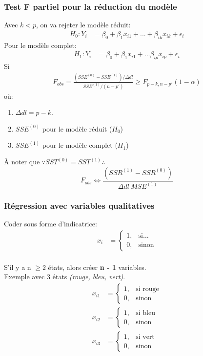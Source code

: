 \documentclass[10pt, french]{article}
\begin{document}
\begin{multicols*}{3}
\subsubsection*{Test F partiel pour la réduction du modèle}
Avec $k < p$, on va rejeter le modèle réduit:
\begin{align*}
H_0 : Y_i &= \beta_0 + \beta_1 x_{i1} + ... + \beta_{ik} x_{ik} + \epsilon_i 
\end{align*}
Pour le modèle complet:
\begin{align*}
H_1 : Y_i &= \beta_0 + \beta_1 x_{i1} + ... \beta_{ip} x_{ip} + \epsilon_i 
\end{align*}
Si
\begin{align*}
F_{obs} = \frac{(SSE^{(0)} - SSE^{(1)}) / \Delta dl}{SSE^{(1)} / (n-p')} \geq F_{p-k, n-p'}(1- \alpha)
\end{align*}
où:
\begin{enumerate}
	\item[] $\Delta dl = p - k$.
	\item[] $SSE^{(0)}$ pour le modèle réduit ($H_0$)
	\item[] $SSE^{(1)}$ pour le modèle complet ($H_1$)
\end{enumerate}

À noter que $\because SST^{(0)} = SST^{(1)} \therefore$
\[
	F_{obs} \Leftrightarrow \frac{(SSR^{(1)} - SSR^{(0)})}{\Delta dl \  MSE^{(1)}}
\]

\subsubsection*{Régression avec variables qualitatives}

Coder sous forme d'indicatrice:
\begin{align*}
	x_{i} &= \left\{
	\begin{matrix}
		1, & \text{si}\dots \\
		0, & \text{sinon}
	\end{matrix}
	\right.\\
\end{align*}

S'il y a n $\ge 2$ états, alors créer \textbf{n - 1} variables.\\
Exemple avec 3 états \textit{(rouge, bleu, vert)}.
\begin{align*}
	x_{i1} &= \left\{
	\begin{matrix}
		1, & \text{si rouge} \\
		0, & \text{sinon}
	\end{matrix}
	\right.\\
	x_{i2} &= \left\{
	\begin{matrix}
		1, & \text{si bleu} \\
		0, & \text{sinon}
	\end{matrix}
	\right.\\
	x_{i3} &= \left\{
	\begin{matrix}
		1, & \text{si vert} \\
		0, & \text{sinon}
	\end{matrix}
	\right.\\ 
\end{align*}


\end{multicols*}
\end{document}
